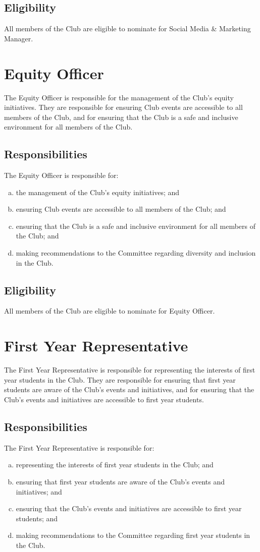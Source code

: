 \documentclass[11pt]{report}
\begin{document}
\subsection{Eligibility}
All members of the Club are eligible to nominate for Social Media \& Marketing Manager.

\section{Equity Officer}
The Equity Officer is responsible for the management of the Club's equity initiatives. They are responsible for ensuring Club events are accessible to all members of the Club, and for ensuring that the Club is a safe and inclusive environment for all members of the Club.
\subsection{Responsibilities}
The Equity Officer is responsible for:
\begin{enumerate}[(a)]
    \item the management of the Club's equity initiatives; and
    \item ensuring Club events are accessible to all members of the Club; and
    \item ensuring that the Club is a safe and inclusive environment for all members of the Club; and
    \item making recommendations to the Committee regarding diversity and inclusion in the Club.
\end{enumerate}
\subsection{Eligibility}
All members of the Club are eligible to nominate for Equity Officer.

\section{First Year Representative}
The First Year Representative is responsible for representing the interests of first year students in the Club. They are responsible for ensuring that first year students are aware of the Club's events and initiatives, and for ensuring that the Club's events and initiatives are accessible to first year students.
\subsection{Responsibilities}
The First Year Representative is responsible for:
\begin{enumerate}[(a)]
    \item representing the interests of first year students in the Club; and
    \item ensuring that first year students are aware of the Club's events and initiatives; and
    \item ensuring that the Club's events and initiatives are accessible to first year students; and
    \item making recommendations to the Committee regarding first year students in the Club.
\end{enumerate}
\end{document}
